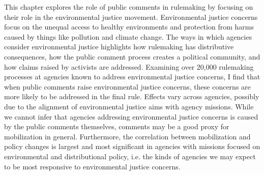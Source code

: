 This chapter explores the role of public comments in rulemaking by focusing on their role in the environmental justice movement. Environmental justice concerns focus on the unequal access to healthy environments and protection from harms caused by things like pollution and climate change. The ways in which agencies consider environmental justice highlights how rulemaking has distributive consequences, how the public comment process creates a political community, and how claims raised by activists are addressed. Examining over 20,000 rulemaking processes at agencies known to address environmental justice concerns, I find that when public comments raise environmental justice concerns, these concerns are more likely to be addressed in the final rule. Effects vary across agencies, possibly due to the alignment of environmental justice aims with agency missions. While we cannot infer that agencies addressing environmental justice concerns is caused by the public comments themselves, comments may be a good proxy for mobilization in general. Furthermore, the correlation between mobilization and policy changes is largest and most significant in agencies with missions focused on environmental and distributional policy, i.e. the kinds of agencies we may expect to be most responsive to environmental justice concerns.
